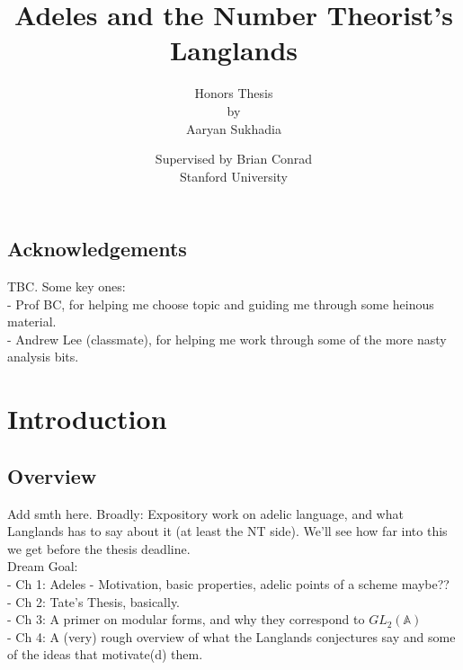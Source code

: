 \documentclass[11pt, x11names, openany]{book}
\renewcommand{\aa}{\mathbb{A}}
\begin{document}
\scshape

\title{\Huge Adeles and the Number Theorist's Langlands}

\author{\Large Honors Thesis \\ \Large by \\ \Large Aaryan Sukhadia}
\date{Supervised by Brian Conrad \\ Stanford University}

\onehalfspacing

\maketitle 

\upshape

\section*{Acknowledgements}

TBC. Some key ones:\\
- Prof BC, for helping me choose topic and guiding me through some heinous material.\\
- Andrew Lee (classmate), for helping me work through some of the more nasty analysis bits.


\tableofcontents

\chapter{Introduction}

\section*{Overview}
\label{section: Overview}
 Add smth here. Broadly: Expository work on adelic language, and what Langlands has to say about it (at least the NT side). We'll see how far into this we get before the thesis deadline.\\

 Dream Goal:\\
 - Ch 1: Adeles - Motivation, basic properties, adelic points of a scheme maybe??\\
 - Ch 2: Tate's Thesis, basically.\\
 - Ch 3: A primer on modular forms, and why they correspond to $GL_2(\aa)$\\
 - Ch 4: A (very) rough overview of what the Langlands conjectures say and some of the ideas that motivate(d) them.
\end{document}
